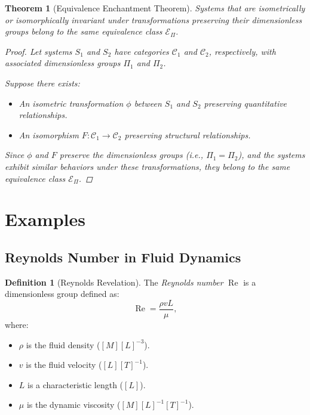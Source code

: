 \documentclass{article}
\newtheorem{theorem}{Theorem}[section]
\theoremstyle{definition}
\newtheorem{definition}{Definition}[section]
\theoremstyle{remark}
\begin{document}
	\begin{theorem}[Equivalence Enchantment Theorem]
		Systems that are isometrically or isomorphically invariant under transformations preserving their dimensionless groups belong to the same equivalence class $\mathcal{E}_\Pi$.
		
		\begin{proof}
			Let systems $S_1$ and $S_2$ have categories $\mathcal{C}_1$ and $\mathcal{C}_2$, respectively, with associated dimensionless groups $\Pi_1$ and $\Pi_2$.
			
			Suppose there exists:
			\begin{itemize}
				\item An isometric transformation $\phi$ between $S_1$ and $S_2$ preserving quantitative relationships.
				\item An isomorphism $F: \mathcal{C}_1 \rightarrow \mathcal{C}_2$ preserving structural relationships.
			\end{itemize}
			
			Since $\phi$ and $F$ preserve the dimensionless groups (i.e., $\Pi_1 = \Pi_2$), and the systems exhibit similar behaviors under these transformations, they belong to the same equivalence class $\mathcal{E}_\Pi$.
		\end{proof}
	\end{theorem}
	
	\section{Examples}
	
	\subsection{Reynolds Number in Fluid Dynamics}
	
	\begin{definition}[Reynolds Revelation]
		The \emph{Reynolds number} $\operatorname{Re}$ is a dimensionless group defined as:
		\[
		\operatorname{Re} = \dfrac{\rho v L}{\mu},
		\]
		where:
		\begin{itemize}
			\item $\rho$ is the fluid density ($[M][L]^{-3}$).
			\item $v$ is the fluid velocity ($[L][T]^{-1}$).
			\item $L$ is a characteristic length ($[L]$).
			\item $\mu$ is the dynamic viscosity ($[M][L]^{-1}[T]^{-1}$).
		\end{itemize}
	\end{definition}
	
\end{document}

